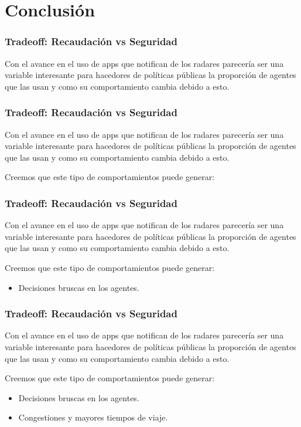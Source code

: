 \documentclass[10pt, compress]{beamer}
\begin{document}
\section{Conclusi\'on}

\begin{frame}[fragile]
\frametitle{Tradeoff: Recaudaci\'on vs Seguridad}
Con el avance en el uso de apps que notifican de los radares parecer\'ia ser una variable interesante para hacedores de pol\'iticas p\'ublicas la proporci\'on de agentes que las usan y como su comportamiento cambia debido a esto.
\end{frame}

\begin{frame}[fragile]
\frametitle{Tradeoff: Recaudaci\'on vs Seguridad}
Con el avance en el uso de apps que notifican de los radares parecer\'ia ser una variable interesante para hacedores de pol\'iticas p\'ublicas la proporci\'on de agentes que las usan y como su comportamiento cambia debido a esto.

Creemos que este tipo de comportamientos puede generar:

\end{frame}

\begin{frame}[fragile]
\frametitle{Tradeoff: Recaudaci\'on vs Seguridad}
Con el avance en el uso de apps que notifican de los radares parecer\'ia ser una variable interesante para hacedores de pol\'iticas p\'ublicas la proporci\'on de agentes que las usan y como su comportamiento cambia debido a esto.

Creemos que este tipo de comportamientos puede generar:

\begin{itemize}
\item Decisiones bruscas en los agentes.
\end{itemize}

\end{frame}

\begin{frame}[fragile]
\frametitle{Tradeoff: Recaudaci\'on vs Seguridad}
Con el avance en el uso de apps que notifican de los radares parecer\'ia ser una variable interesante para hacedores de pol\'iticas p\'ublicas la proporci\'on de agentes que las usan y como su comportamiento cambia debido a esto.

Creemos que este tipo de comportamientos puede generar:

\begin{itemize}
\item Decisiones bruscas en los agentes.
\item Congestiones y mayores tiempos de viaje.
\end{itemize}

\end{frame}
\end{document}
